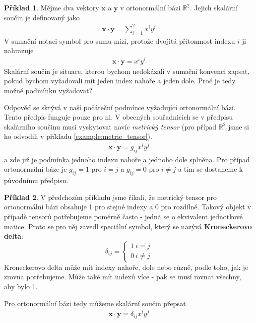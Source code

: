\documentclass[a5paper,12pt]{amsbook}
\theoremstyle{definition}
\newtheorem{example}{Příklad}[chapter]
\newcommand{\myvec}[1]{\bm{#1}}
\newcommand{\myspace}[1]{\mathbb{#1}}
\begin{document}
\begin{example}
Mějme dva vektory $\myvec{x}$ a $\myvec{y}$ v ortonormální bázi $\myspace{R}^2$. Jejich skalární součin
je definovaný jako
\begin{equation*}
\begin{split}
\myvec{x}\cdot\myvec{y} = \sum_{i=1}^{2}x^i y^i
\end{split}
\end{equation*}
V sumační notaci symbol pro sumu mizí, protože dvojitá přítomnost indexu $i$ ji nahrazuje
\begin{equation*}
\begin{split}
\myvec{x}\cdot\myvec{y} = x^i y^i
\end{split}
\end{equation*}
Skalární součin je situace, kterou bychom nedokázali v sumační konvenci zapsat, pokud bychom
vyžadovali mít jeden index nahoře a jeden dole. Proč je tedy možné podmínku vyžadovat?

Odpověď se skrývá v naší počáteční podmínce vyžadující ortonormální bázi. Tento předpis
funguje pouze pro ni. V obecných souřadnicích se v předpisu skalárního součinu musí
vyskytovat navíc \textit{metrický tensor} (pro případ $\myspace{R}^2$ jsme si ho odvodili
v příkladu \ref{example:metric_tensor}).
\begin{equation*}
\begin{split}
\myvec{x}\cdot\myvec{y} = g_{ij} x^i y^j
\end{split}
\end{equation*}
a zde již je podmínka jednoho indexu nahoře a jednoho dole splněna. Pro případ ortonormální báze
je $g_{ij} = 1$ pro $i=j$ a $g_{ij} = 0$ pro $i\neq j$ a tím se dostaneme k původnímu předpisu.
\end{example}

\begin{example}
V předchozím příkladu jsme říkali, že metrický tensor pro ortonormální bázi obsahuje 1 pro
stejné indexy a 0 pro rozdílné. Takový objekt v případě tensorů potřebujeme poměrně často - jedná
se o ekvivalent jednotkové matice. Proto se pro něj zavedl speciální symbol, který se nazývá
\textbf{Kroneckerovo delta}:
\begin{equation*}
\delta_{ij} =
\begin{cases}
1 \: i = j \\
0 \: i \neq j
\end{cases}
\end{equation*}
Kroneckerovo delta může mít indexy nahoře, dole nebo různě, podle toho, jak je zrovna potřebujeme.
Může také mít indexů více - pak se musí rovnat všechny, aby bylo 1.

Pro ortonormální bázi tedy můžeme skalární součin přepsat
\begin{equation*}
\begin{split}
\myvec{x}\cdot\myvec{y} = \delta_{ij} x^i y^j
\end{split}
\end{equation*}
\end{example}
\end{document}

